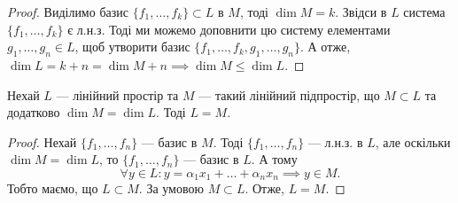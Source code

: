 \documentclass{math_library}
\begin{document}
	\begin{proof}
	Виділимо базис $\{f_1,\dots,f_k\} \subset L$ в $M$, тоді $\dim M = k$. Звідси в $L$ система $\{f_1,\dots,f_k\}$ є л.н.з. Тоді ми можемо доповнити цю систему елементами $g_1,\dots,g_n \in L$, щоб утворити базис $\{f_1,\dots,f_k,g_1,\dots,g_n\}$. А отже, $\dim L = k+n = \dim M + n \implies \dim M \leq \dim L$.
	\end{proof}
	
	\begin{proposition}
	\label{about_same_dim_prp}
	Нехай $L$ --- лінійний простір та $M$ --- такий лінійний підпростір, що $M \subset L$ та додатково $\dim M = \dim L$. Тоді $L=M$.
	\end{proposition}
	
	\begin{proof}
	Нехай $\{f_1,\dots,f_n\}$ --- базис в $M$. Тоді $\{f_1,\dots,f_n\}$ --- л.н.з. в $L$, але оскільки $\dim M = \dim L$, то $\{f_1,\dots,f_n\}$ --- базис в $L$. А тому 
	\[
	\forall y \in L: y = \alpha_1 x_1 + \dots + \alpha_n x_n \implies y \in M.
	\]
	Тобто маємо, що $L \subset M$. За умовою $M \subset L$. Отже, $L=M$.
	\end{proof}
	

	
\end{document}
